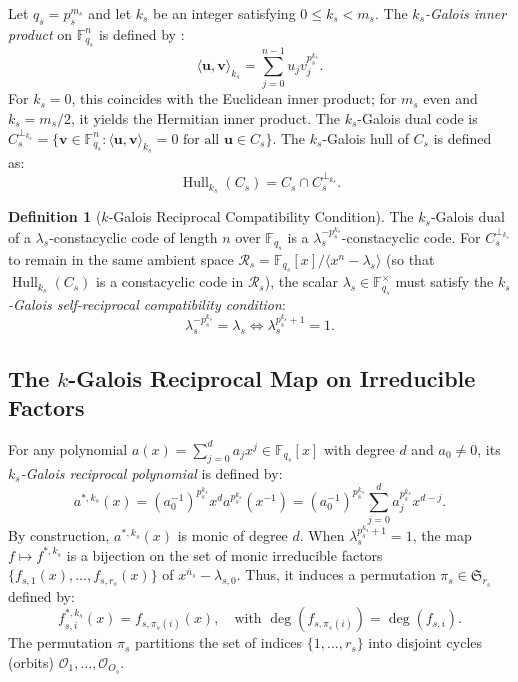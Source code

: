 \documentclass[preprint,12pt]{elsarticle}
\numberwithin{equation}{section}
\theoremstyle{plain}
\theoremstyle{definition}
\newtheorem{definition}[theorem]{Definition}
\theoremstyle{remark}
\begin{document}
Let $q_s = p_s^{m_s}$ and let $k_s$ be an integer satisfying $0 \le k_s < m_s$. The \emph{$k_s$-Galois inner product} on $\mathbb{F}_{q_s}^n$ is defined by \cite{Fan2018}:
\begin{equation}
    \langle \mathbf{u}, \mathbf{v}\rangle_{k_s} = \sum_{j=0}^{n-1} u_j v_j^{p_s^{k_s}}.
\end{equation}
For $k_s = 0$, this coincides with the Euclidean inner product; for $m_s$ even and $k_s = m_s/2$, it yields the Hermitian inner product. The $k_s$-Galois dual code is $C_s^{\perp_{k_s}} = \{\mathbf{v} \in \mathbb{F}_{q_s}^n : \langle \mathbf{u}, \mathbf{v}\rangle_{k_s} = 0 \text{ for all } \mathbf{u} \in C_s\}$. The $k_s$-Galois hull of $C_s$ is defined as:
\begin{equation}
    \operatorname{Hull}_{k_s}(C_s) = C_s \cap C_s^{\perp_{k_s}}.
\end{equation}

\begin{definition}[$k$-Galois Reciprocal Compatibility Condition]
The $k_s$-Galois dual of a $\lambda_s$-constacyclic code of length $n$ over $\mathbb{F}_{q_s}$ is a $\lambda_s^{-p_s^{k_s}}$-constacyclic code. For $C_s^{\perp_{k_s}}$ to remain in the same ambient space $\mathcal{R}_s = \mathbb{F}_{q_s}[x]/\langle x^n - \lambda_s\rangle$ (so that $\operatorname{Hull}_{k_s}(C_s)$ is a constacyclic code in $\mathcal{R}_s$), the scalar $\lambda_s \in \mathbb{F}_{q_s}^\times$ must satisfy the \emph{$k_s$-Galois self-reciprocal compatibility condition}:
\begin{equation}\label{eq:compatibility}
    \lambda_s^{-p_s^{k_s}} = \lambda_s \iff \lambda_s^{p_s^{k_s} + 1} = 1.
\end{equation}
\end{definition}

\subsection{The \texorpdfstring{$k$}{k}-Galois Reciprocal Map on Irreducible Factors}
For any polynomial $a(x) = \sum_{j=0}^d a_j x^j \in \mathbb{F}_{q_s}[x]$ with degree $d$ and $a_0 \ne 0$, its \emph{$k_s$-Galois reciprocal polynomial} is defined by:
\begin{equation}
    a^{*, k_s}(x) = (a_0^{-1})^{p_s^{k_s}} x^d a^{p_s^{k_s}}(x^{-1}) = (a_0^{-1})^{p_s^{k_s}} \sum_{j=0}^d a_j^{p_s^{k_s}} x^{d - j}.
\end{equation}
By construction, $a^{*, k_s}(x)$ is monic of degree $d$. When $\lambda_s^{p_s^{k_s} + 1} = 1$, the map $f \mapsto f^{*, k_s}$ is a bijection on the set of monic irreducible factors $\{f_{s, 1}(x), \dots, f_{s, r_s}(x)\}$ of $x^{\bar{n}_s} - \lambda_{s, 0}$. Thus, it induces a permutation $\pi_s \in \mathfrak{S}_{r_s}$ defined by:
\begin{equation}
    f_{s, i}^{*, k_s}(x) = f_{s, \pi_s(i)}(x), \quad \text{with } \deg(f_{s, \pi_s(i)}) = \deg(f_{s, i}).
\end{equation}
The permutation $\pi_s$ partitions the set of indices $\{1, \dots, r_s\}$ into disjoint cycles (orbits) $\mathcal{O}_1, \dots, \mathcal{O}_{O_s}$.
\end{document}
